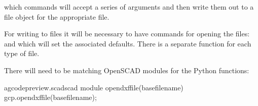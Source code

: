 \documentclass{ltxdoc}
\begin{document}
\noindent which commands will accept a series of arguments and then write them out to a file object for the appropriate file. 

 
For writing to files it will be necessary to have commands for opening the files:  and  which will set the associated defaults. There is a separate function for each type of file.


%
There will need to be matching OpenSCAD modules for the Python functions:

\lstset{firstnumber=\thegcpscad}
\begin{writecode}{a}{gcodepreview.scad}{scad}
module opendxffile(basefilename){
    gcp.opendxffile(basefilename);
}

\end{writecode}
\addtocounter{gcpscad}{8}

\end{document}

